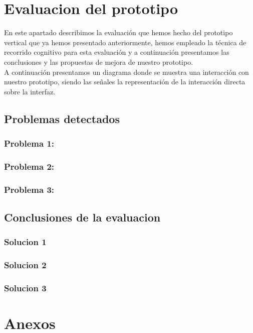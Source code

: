 \documentclass[a4paper,11pt]{article}
\begin{document}
\section{Evaluacion del prototipo}
En este apartado describimos la evaluación que hemos hecho del prototipo vertical que ya hemos presentado anteriormente, hemos empleado la técnica de recorrido cognitivo para esta evaluación y a continuación presentamos las conclusiones y las propuestas de mejora de nuestro prototipo.\\
A continuación presentamos un diagrama donde se muestra una interacción con nuestro prototipo, siendo las señales la representación de la interacción directa sobre la interfaz.



\subsection{Problemas detectados}
\subsubsection{Problema 1:}
\subsubsection{Problema 2:}
\subsubsection{Problema 3:}

\subsection{Conclusiones de la evaluacion}
\subsubsection{Solucion 1}
\subsubsection{Solucion 2}
\subsubsection{Solucion 3}



\section{Anexos}
\end{document}
